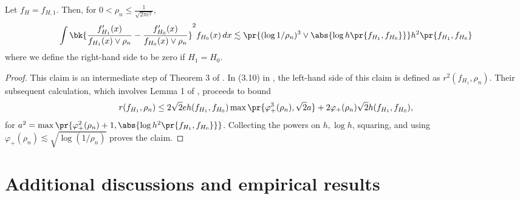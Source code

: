 \documentclass[12pt, reqno]{amsart}
\newcommand{\invphi}{\varphi_{+}}
\numberwithin{equation}{section}
\begin{document}
\begin{refsection}
\begin{appendices}
\begin{lemma}
\label{lemma:misspec_prior}
Let $f_{H} = f_{H,1}$. Then, for $0 < \rho_n \le \frac{1}{\sqrt{2\pi e^2}}$, \begin{align*}
\int \bk{ \frac{f'_{H_1}(x)}{f_{H_1}(x) \vee \rho_n} - \frac{f'_{H_0}
    (x)}{f_{H_0}(x) \vee \rho_n} }^2 f_{H_0}(x)\,dx 
    \lesssim \pr{(\log 1/\rho_n)^{3} \vee
    \abs{\log h \pr{f_{H_1}, f_{H_0}}}} h^2 \pr{f_{H_1}, f_{H_0}}
\end{align*}
where we define the right-hand side to be zero if $H_1 = H_0$.
\end{lemma}

\begin{proof}
This claim is an intermediate step of Theorem 3 of \citet{jiang2009general}. In (3.10) in
\citet{jiang2009general}, the left-hand side of this claim is defined as $r^2(f_{H_1},
\rho_n)$. Their subsequent calculation, which involves Lemma 1 of \citet{jiang2009general},
proceeds to bound \[ r(f_{H_1}, \rho_n) \le 2\sqrt{2} e h(f_{H_1}, f_{H_0}) \max
\pr{\invphi^3(\rho_n), \sqrt{2}a} + 2\invphi(\rho_n) \sqrt{2} h(f_{H_1}, f_{H_0}),
\]
for $a^2 = \max\pr{
    \invphi^2(\rho_n) + 1, \abs{\log h^2\pr{f_{H_1}, f_{H_0}}} }$.
    Collecting
     the powers on $h, \log h$, squaring, and using $\invphi(\rho_n) \lesssim
\sqrt{\log (1/\rho_n)}$ proves the claim.
\end{proof}



























\newpage 


\part{Additional discussions and empirical results}



\end{appendices}
\end{refsection}
\end{document}
